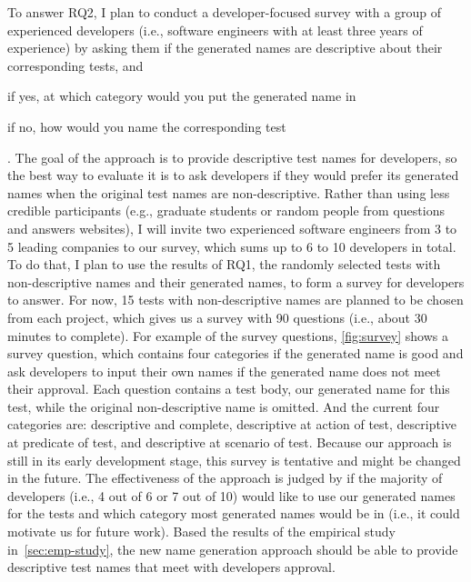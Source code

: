 To answer RQ2, I plan to conduct a developer-focused survey with a group of experienced developers (i.e., software engineers with at least three years of experience) by asking them if the generated names are descriptive about their corresponding tests, and
\begin{enumerate*}
    \item if yes, at which category would you put the generated name in
    \item if no, how would you name the corresponding test
\end{enumerate*}.
%
The goal of the approach is to provide descriptive test names for developers, so the best way to evaluate it is to ask developers if they would prefer its generated names when the original test names are non-descriptive.
%
Rather than using less credible participants (e.g., graduate students or random people from questions and answers websites), I will invite two experienced software engineers from \num{3} to \num{5} leading companies to our survey, which sums up to \num{6} to \num{10} developers in total.
%
To do that, I plan to use the results of RQ1, the randomly selected tests with non-descriptive names and their generated names, to form a survey for developers to answer.
%
For now, \num{15} tests with non-descriptive names are planned to be chosen from each project, which gives us a survey with \num{90} questions (i.e., about \num{30} minutes to complete).
%
For example of the survey questions, \cref{fig:survey} shows a survey question, which contains four categories if the generated name is good and ask developers to input their own names if the generated name does not meet their approval.
%
Each question contains a test body, our generated name for this test, while the original non-descriptive name is omitted.
%
And the current four categories are: descriptive and complete, descriptive at action of test, descriptive at predicate of test, and descriptive at scenario of test.
%
Because our approach is still in its early development stage, this survey is tentative and might be changed in the future.
%
The effectiveness of the approach is judged by if the majority of developers (i.e., \num{4} out of \num{6} or \num{7} out of \num{10}) would like to use our generated names for the tests and which category most generated names would be in (i.e., it could motivate us for future work).
%
Based the results of the empirical study in~\cref{sec:emp-study}, the new name generation approach should be able to provide descriptive test names that meet with developers approval.


